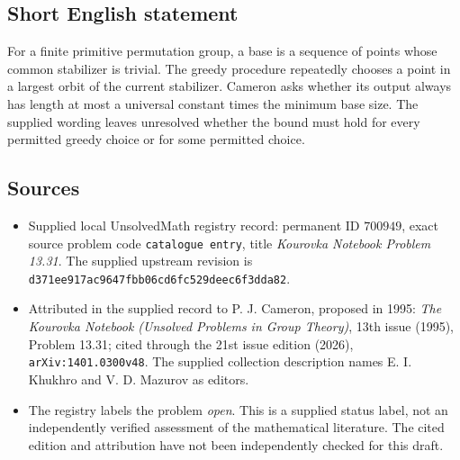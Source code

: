 \documentclass[11pt]{article}
\begin{document}
\subsection{Short English statement}
For a finite primitive permutation group, a base is a sequence of points whose common stabilizer is trivial. The greedy procedure repeatedly chooses a point in a largest orbit of the current stabilizer. Cameron asks whether its output always has length at most a universal constant times the minimum base size. The supplied wording leaves unresolved whether the bound must hold for every permitted greedy choice or for some permitted choice.
\subsection{Sources}
\begin{itemize}
\item Supplied local UnsolvedMath registry record: permanent ID \(700949\), exact source problem code \texttt{catalogue entry}, title \emph{Kourovka Notebook Problem 13.31}. The supplied upstream revision is \texttt{d371ee917ac9647fbb06cd6fc529deec6f3dda82}.
\item Attributed in the supplied record to P. J. Cameron, proposed in 1995: \emph{The Kourovka Notebook (Unsolved Problems in Group Theory)}, 13th issue (1995), Problem 13.31; cited through the 21st issue edition (2026), \texttt{arXiv:1401.0300v48}. The supplied collection description names E. I. Khukhro and V. D. Mazurov as editors.
\item The registry labels the problem \emph{open}. This is a supplied status label, not an independently verified assessment of the mathematical literature. The cited edition and attribution have not been independently checked for this draft.
\end{itemize}
\end{document}

